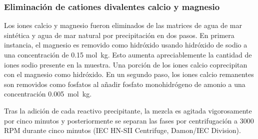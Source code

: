  
\subsubsection{Eliminación de cationes divalentes calcio y magnesio}\label{sec:preci}
Los iones calcio y magnesio fueron eliminados de las matrices de agua de mar sintética y agua de mar natural por precipitación en dos pasos. En primera instancia, el magnesio es removido como hidróxido usando hidróxido de sodio a una concentración de 0.15 mol~kg\mnn. Esto aumenta apreciablemente la cantidad de iones sodio presente en la muestra. Una porción de los iones calcio coprecipitan con el magnesio como hidróxido. En un segundo paso, los iones calcio remanentes son removidos como fosfatos al añadir fosfato monohidrógeno de amonio a una concentración 0.005~mol~kg\mnn. 

Tras la adición de cada reactivo precipitante, la mezcla es agitada vigorosamente por cinco mi\-nu\-tos y posteriormente se separan las fases por centrifugación a 3000 \ac{RPM} durante cinco minutos (IEC HN-SII Centrifuge, Damon/IEC Division).

\clearpage{}